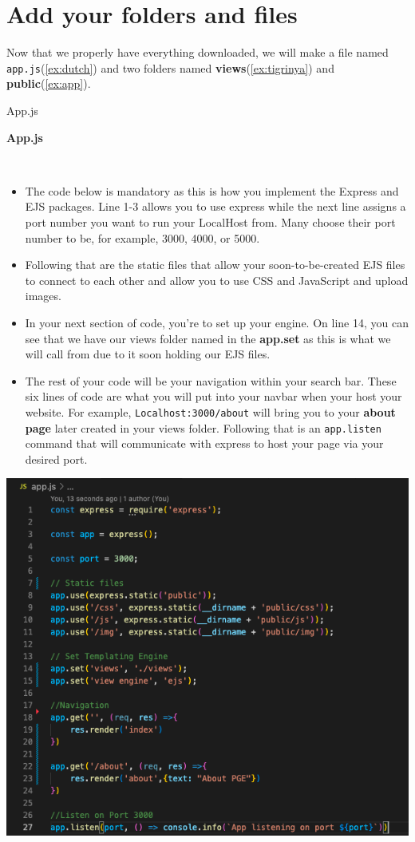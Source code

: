 \documentclass[a4paper,12pt]{article}
\begin{document}
\pagebreak\section{Add your folders and files}

Now that we properly have everything downloaded, we will make a file named \verb|app.js|(\ref{ex:dutch}) and two folders named \textbf{views}(\ref{ex:tigrinya}) and \textbf{public}(\ref{ex:app}).
 
\begin{exe}
\ex \label{ex:dutch}
\gll App.js\\

\begin{large} \textbf{App.js}\end{large} \\
\begin{itemize}
\item The code below is mandatory as this is how you implement the Express and EJS packages. Line 1-3 allows you to use express while the next line assigns a port number you want to run your LocalHost from. Many choose their port number to be, for example, 3000, 4000, or 5000. 
\item Following that are the static files that allow your soon-to-be-created EJS files to connect to each other and allow you to use CSS and JavaScript and upload images.
\item In your next section of code, you're to set up your engine. On line 14, you can see that we have our views folder named in the \textbf{app.set} as this is what we will call from due to it soon holding our EJS files.
\item The rest of your code will be your navigation within your search bar. These six lines of code are what you will put into your navbar when your host your website. For example, \verb|Localhost:3000/about| will bring you to your \textbf{about page} later created in your views folder. Following that is an \verb|app.listen| command that will communicate with express to host your page via your desired port. 
\end{itemize}
\includegraphics[scale=.7]{appjs.png} 
\end{exe}
\end{document}
